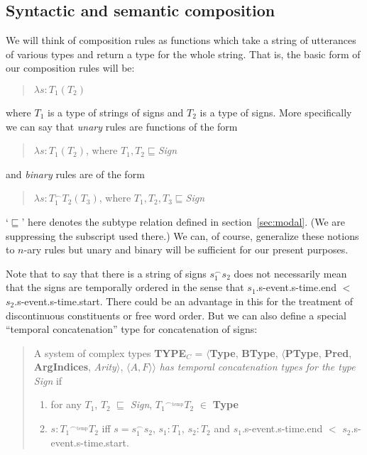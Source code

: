  

\subsection*{Syntactic and semantic composition}

We will think of composition rules as functions which take a string of
utterances of various types and return a type for the whole string.
That is, the basic form of our composition rules will be:
\begin{quote}
$\lambda s:T_1(T_2)$
\end{quote}
where $T_1$ is a type of strings of signs and $T_2$ is a type of
signs.  More specifically we can say that \textit{unary} rules are
functions of the form
\begin{quote}
$\lambda s:T_1(T_2)$, where $T_1,T_2\sqsubseteq$\textit{Sign}
\end{quote}
and \textit{binary} rules are of the form
\begin{quote}
$\lambda s:T_1^{\frown}T_2(T_3)$, where $T_1,T_2,T_3\sqsubseteq$\textit{Sign} 
\end{quote}
\noindent `$\sqsubseteq$' here denotes the subtype relation defined in
section~\ref{sec:modal}.  (We are suppressing the subscript used
there.)  We can, of course, generalize these notions to $n$-ary rules
but unary and binary will be sufficient for our present purposes.

Note that to say that there is a string of signs $s_1^{\frown}s_2$ does not necessarily mean that
the signs are temporally ordered in the sense that
$s_1$.s-event.s-time.end $<$ $s_2$.s-event.s-time.start.  There could
be an advantage in this for the treatment of discontinuous
constituents or free word order.  But we can also define a special
``temporal concatenation'' type for concatenation of signs:

\begin{quote}
A system of complex types \textbf{TYPE}$_C$ = $\langle${\bf Type}, {\bf BType},
$\langle$\textbf{PType}, {\bf Pred}, \textbf{ArgIndices}, {\it
  Arity\/}$\rangle$, $\langle A,F\rangle$$\rangle$ \textit{has
  temporal concatenation types for the type Sign} if 
\begin{enumerate} 
 
\item for any $T_1$, $T_2$ $\sqsubseteq$ \textit{Sign},  ${T_1}^{\frown_{\mathrm{temp}}}\!T_2$ $\in$ {\bf Type} 
 
\item $s : {T_1}^{\frown_{\mathrm{temp}}}\!T_2$ iff
  $s=s_1^\frown\!s_2$, $s_1:T_1$, $s_2:T_2$ and $s_1$.s-event.s-time.end
  $<$ $s_2$.s-event.s-time.start. 
 
\end{enumerate}

\end{quote}
\noindent 

